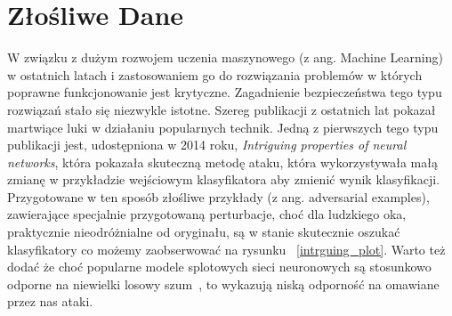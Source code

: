 \documentclass[
    left=2.5cm,         %
    right=2.5cm,        %
    top=2.5cm,          %
    bottom=3cm,         %
    bindingoffset=6mm,  %
    nohyphenation=false %
]{eiti/eiti-thesis}
\begin{document}

\newpage

\section{Złośliwe Dane}
W związku z dużym rozwojem uczenia maszynowego (z ang. Machine Learning) w ostatnich latach i zastosowaniem go do
rozwiązania problemów w których poprawne funkcjonowanie jest krytyczne. Zagadnienie bezpieczeństwa tego typu rozwiązań stało
się niezwykle istotne. Szereg publikacji z ostatnich lat pokazał martwiące luki w działaniu popularnych technik.
Jedną z pierwszych tego typu publikacji jest, udostępniona w 2014 roku, \textit{Intriguing properties of neural networks}\cite{DBLP:journals/corr/SzegedyZSBEGF13},
która pokazała skuteczną metodę ataku, która wykorzystywała małą zmianę w przykładzie wejściowym klasyfikatora aby zmienić wynik klasyfikacji.
Przygotowane w ten sposób złośliwe przykłady (z ang. adversarial examples), zawierające specjalnie przygotowaną perturbacje,
choć dla ludzkiego oka, praktycznie nieodróżnialne od oryginału, są w stanie skutecznie oszukać klasyfikatory co możemy zaobserwować na rysunku ~\ref{intrguing_plot}.
Warto też dodać że choć popularne modele splotowych sieci neuronowych są stosunkowo odporne na niewielki losowy szum~\cite{DBLP:journals/corr/abs-1807-10108}, to wykazują niską odporność na omawiane przez nas ataki.
\end{document}
